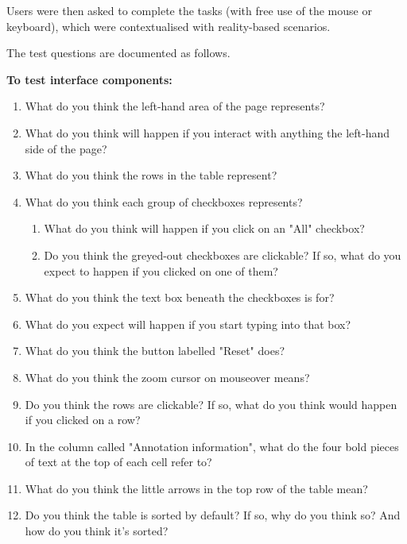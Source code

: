 Users were then asked to complete the tasks (with free use of the mouse or keyboard), which were contextualised with reality-based scenarios.


The test questions are documented as follows.

\textbf{To test interface components:}
\begin{enumerate}
 \item What do you think the left-hand area of the page represents?
 \item What do you think will happen if you interact with anything the left-hand side of the page?
  \item What do you think the rows in the table represent?
  \item What do you think each group of checkboxes represents? 
   \begin{enumerate}
    \item What do you think will happen if you click on an "All" checkbox?
    \item Do you think the greyed-out checkboxes are clickable? If so, what do you expect to happen if you clicked on one of them?
   \end{enumerate}
  \item What do you think the text box beneath the checkboxes is for?
  \item What do you expect will happen if you start typing into that box?
  \item What do you think the button labelled "Reset" does?
  \item What do you think the zoom cursor on mouseover means?
  \item Do you think the rows are clickable? If so, what do you think would happen if you clicked on a row?
  \item In the column called "Annotation information", what do the four bold pieces of text at the top of each cell refer to?
  \item What do you think the little arrows in the top row of the table mean?
  \item Do you think the table is sorted by default? If so, why do you think so? And how do you think it's sorted? 
\end{enumerate}

